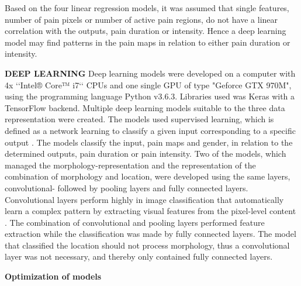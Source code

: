 \noindent
Based on the four linear regression models, it was assumed that single features, number of pain pixels or number of active pain regions, do not have a linear correlation with the outputs, pain duration or intensity. Hence a deep learning model may find patterns in the pain maps in relation to either pain duration or intensity. \newline

\noindent
\textbf{DEEP LEARNING}\newline
\noindent
Deep learning models were developed on a computer with 4x ‘‘Intel® Core™ i7‘‘ CPUs and one single GPU of type "Geforce GTX 970M", using the programming language Python v3.6.3. Libraries used was Keras with a TensorFlow backend. \newline
\noindent
Multiple deep learning models suitable to the three data representation were created. The models used supervised learning, which is defined as a network learning to classify a given input corresponding to a specific output \citep{Goodfellow2016}. The models classify the input, pain maps and gender, in relation to the determined outputs, pain duration or pain intensity.\newline
\noindent
Two of the models, which managed the morphology-representation and the representation of the combination of morphology and location, were developed using the same layers, convolutional- followed by pooling layers and fully connected layers. Convolutional layers perform highly in image classification that automatically learn a complex pattern by extracting visual features from the pixel-level content \citep{Acquarelli2017,LeCun1998}. The combination of convolutional and pooling layers performed feature extraction while the classification was made by fully connected layers. \newline
\noindent
The model that classified the location should not process morphology, thus a convolutional layer was not necessary, and thereby only contained fully connected layers. \newline

\noindent
\textbf{Optimization of models}\newline
\noindent




